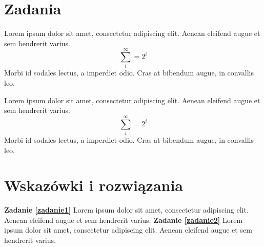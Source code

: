 \section{Zadania}
\begin{problem}
    \label{zadanie1}
    Lorem ipsum dolor sit amet, consectetur adipiscing elit. Aenean eleifend augue et sem hendrerit varius.
    \begin{equation*}
        \sum^{\infty}_{i} = 2^i
    \end{equation*}
    Morbi id sodales lectus, a imperdiet odio. Cras at bibendum augue, in convallis leo.
\end{problem}
\begin{problem}
    \label{zadanie2}
    Lorem ipsum dolor sit amet, consectetur adipiscing elit. Aenean eleifend augue et sem hendrerit varius.
    \begin{equation*}
        \sum^{\infty}_{i} = 2^i
    \end{equation*}
    Morbi id sodales lectus, a imperdiet odio. Cras at bibendum augue, in convallis leo.
\end{problem}

\section{Wskazówki i rozwiązania}
\textbf{Zadanie \ref{zadanie1}}
Lorem ipsum dolor sit amet, consectetur adipiscing elit. Aenean eleifend augue et sem hendrerit varius.
\newline
\textbf{Zadanie \ref{zadanie2}}
Lorem ipsum dolor sit amet, consectetur adipiscing elit. Aenean eleifend augue et sem hendrerit varius.